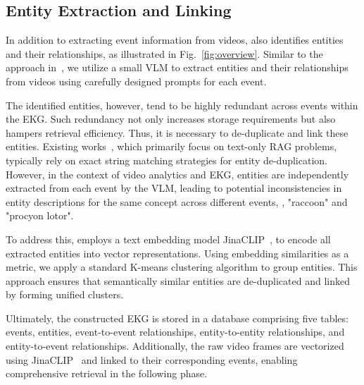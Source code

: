 \subsection{Entity Extraction and Linking}
\label{subsec:entity_extraction}




In addition to extracting event information from videos, \sysname also identifies entities and their relationships, as illustrated in Fig.~\ref{fig:overview}. Similar to the approach in~\cite{edge2024graphrag}, we utilize a small VLM to extract entities and their relationships from videos using carefully designed prompts for each event.

The identified entities, however, tend to be highly redundant across events within the EKG. Such redundancy not only increases storage requirements but also hampers retrieval efficiency. Thus, it is necessary to de-duplicate and link these entities. Existing works~\cite{edge2024graphrag, guo2024lightrag, fan2025minirag}, which primarily focus on text-only RAG problems, typically rely on exact string matching strategies for entity de-duplication. However, in the context of video analytics and EKG, entities are independently extracted from each event by the VLM, leading to potential inconsistencies in entity descriptions for the same concept across different events, \eg, "raccoon" and "procyon lotor".

To address this, \sysname employs a text embedding model \eg JinaCLIP~\cite{koukounas2024jinaclip}, to encode all extracted entities into vector representations. Using embedding similarities as a metric, we apply a standard K-means clustering algorithm to group entities. This approach ensures that semantically similar entities are de-duplicated and linked by forming unified clusters. 

Ultimately, the constructed EKG is stored in a database comprising five tables: events, entities, event-to-event relationships, entity-to-entity relationships, and entity-to-event relationships. Additionally, the raw video frames are vectorized using JinaCLIP~\cite{koukounas2024jinaclip} and linked to their corresponding events, enabling comprehensive retrieval in the following phase.












